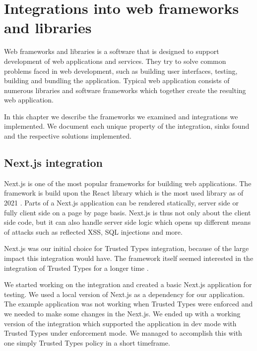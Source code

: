 \chapter{Integrations into web frameworks and libraries}

Web frameworks and libraries is a software that is designed to support development of web
applications and services. They try to solve common problems faced in web development, such as
building user interfaces, testing, building and bundling the application. Typical web application
consists of numerous libraries and software frameworks which together create the resulting web
application.

In this chapter we describe the frameworks we examined and integrations we implemented. We document
each unique property of the integration, sinks found and the respective solutions implemented.

\section{Next.js integration}
\label{intro-nextjs}

Next.js is one of the most popular frameworks for building web applications. The framework is build
upon the React library which is the most used library as of 2021 \cite{react_most_used_2021}. Parts
of a Next.js application can be rendered statically, server side or fully client side on a page by
page basis. Next.js is thus not only about the client side code, but it can also handle server side
logic which opens up different means of attacks such as reflected XSS, SQL injections and more.

Next.js was our initial choice for Trusted Types integration, because of the large impact this
integration would have. The framework itself seemed interested in the integration of Trusted Types
for a longer time \cite{nextjs_tt_pr_2020}.

We started working on the integration and created a basic Next.js application for testing. We used a
local version of Next.js as a dependency for our application. The example application was not
working when Trusted Types were enforced and we needed to make some changes in the Next.js. We ended
up with a working version of the integration which supported the application in dev mode with
Trusted Types under enforcement mode. We managed to accomplish this with one simply Trusted Types
policy in a short timeframe.

